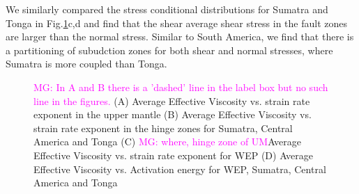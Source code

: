 \documentclass[12pt]{article}
\newcommand{\mgnote}[1]{\textcolor{magenta}{MG: #1}}
\begin{document}
{We similarly compared the stress conditional distributions for Sumatra and Tonga in Fig.\ref{fig:shear_smaller}c,d and find that the shear average shear stress in the fault zones are larger than the normal stress. Similar to South America, we find that there is a partitioning of subudction zones for both shear and normal stresses, where Sumatra is more coupled than Tonga.


\begin{figure}[H]
\centering
\hspace{-0.2cm}
\hspace{-0.2cm}
\hspace{-0.2cm}
\hspace{-0.2cm}
\caption{
\mgnote{In A and B there is a 'dashed' line in the label box but no such line in the figures.}
(A) Average Effective Viscosity vs. strain rate exponent in the upper mantle  
(B)  Average Effective Viscosity vs. strain rate exponent in the hinge zones  for Sumatra, Central America and Tonga
(C) \mgnote{where, hinge zone of UM}Average Effective Viscosity vs. strain rate exponent for WEP (D) Average Effective Viscosity vs. Activation energy for WEP, Sumatra, Central America and Tonga}
\label{fig:shear_smaller}
\end{figure}

}
\end{document}

